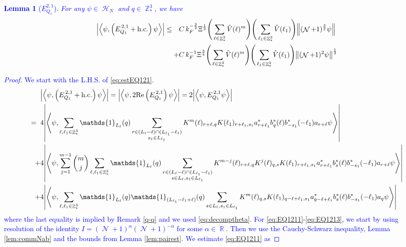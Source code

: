 \documentclass[sn-mathphys, Numbered ,a4paper]{sn-jnl}%
\DeclareMathOperator{\R}{\mathbb{R}}
\DeclareMathOperator{\Z}{\mathbb{Z}}
\DeclareMathOperator{\HH}{\mathcal{H}}
\DeclareMathOperator{\NN}{\mathcal{N}}
\newcommand{\half}{\frac{1}{2}}
\newcommand{\eva}[1]{\left\langle #1 \right\rangle}
\theoremstyle{plain}
\newtheorem{lemma}[theorem]{Lemma}
\theoremstyle{definition}
\theoremstyle{remark}
\theoremstyle{plain}
\theoremstyle{definition}
\theoremstyle{remark}
\begin{document}
\textcolor{blue}{\begin{lemma}[$E_{Q_1}^{2,1}$]
For any $\psi \in \HH_N$ and $q \in \Z^3_*$, we have
\begin{alignat}{2}
	\abs{\eva{\psi,\left(E^{\,2,1}_{Q_1}+\mathrm{h.c.}\right) \psi }}\nonumber
	 \leq \quad &C\,  k_{F}^{-\frac{3}{2}} \Xi^\half \Bigg(\sum\limits_{\ell \in \Z^3_*} \hat{V}(\ell)^m\Bigg)\Bigg( \sum\limits_{\ell_1 \in \Z^3_*} \hat{V}(\ell_1) \Bigg) \norm { (\NN+1)^{\frac{3}{2}} \psi }\\
	\quad+ &C\, k_{F}^{-1}\Xi^{\frac{3}{4}} \Bigg(\sum\limits_{\ell \in \Z^3_*} \hat{V}(\ell)^m\Bigg) \Bigg(\sum\limits_{\ell_1 \in \Z^3_*} \hat{V}(\ell_1) \Bigg)  \norm{ (\NN+1)^2\psi}^\half\label{eq:estEQ121}
\end{alignat}
\end{lemma}
\begin{proof}
We start with the L.H.S. of \eqref{eq:estEQ121}.
\begin{align}
	&\abs{\eva{\psi,\left(E^{\,2,1}_{Q_1}+\mathrm{h.c.}\right) \psi }} = \abs{\eva{\psi,2\mathrm{Re}\left(E^{\,2,1}_{Q_1}\right) \psi }} = 2\abs{\eva{\psi, E^{\,2,1}_{Q_1} \psi }}\nonumber\\
	=\;\;&4  \abs{\eva{\psi, \sum\limits_{\ell, \ell_1\in \Z^3_*} \mathds{1}_{L_{\ell}}(q) \sum\limits_{\substack{r\in (L_{\ell}-\ell) \cap (L_{\ell_1}-\ell_1)\\ s_1\in L_{\ell_1} }} K^m(\ell )_{r+\ell,q}K(\ell_1)_{r+\ell_1,s_1}
	a^*_{r+\ell_1} b^*_{q}(\ell) b^*_{-s_1}(-\ell_1)a_{r+\ell} \psi }} \label{eq:EQ1211}\\
	\;+&4   \abs{\eva{\psi, \sum\limits_{j=1}^{m-1} {{m}\choose j} \sum\limits_{\ell, \ell_1\in \Z^3_*}\mathds{1}_{L_{\ell}}(q) \sum\limits_{\substack{r\in (L_{\ell}-\ell) \cap (L_{\ell_1}-\ell_1)\\ s \in L_{\ell},s_1\in L_{\ell_1} }} K^{m-j}(\ell)_{r+\ell,q} K^{j}(\ell)_{q,s} K(\ell_1)_{r+\ell_1,s_1} a^*_{r+\ell_1} b^*_{s}(\ell) b^*_{-s_1}(-\ell_1) a_{r+\ell} \psi }} \label{eq:EQ1212}\\
	\;+&4\abs{\eva{\psi, \sum\limits_{\ell, \ell_1\in \Z^3_*} \mathds{1}_{L_{\ell}}(q) \mathds{1}_{(L_{\ell_1}-\ell_1+\ell)}(q) \sum\limits_{s \in L_{\ell},s_1\in L_{\ell_1}}  K^m(\ell)_{q,s} K(\ell_1)_{q-\ell+\ell_1,s_1} a^*_{q-\ell+\ell_1} b^*_{s}(\ell) b^*_{-s_1}(-\ell_1) a_{q} \psi }}\label{eq:EQ1213}
\end{align}
where the last equality is implied by Remark \ref{q-q} and we used \eqref{eq:decomptheta}.
For \eqref{eq:EQ1211}-\eqref{eq:EQ1213}, we start by using resolution of the identity $I = (\NN+1)^{\alpha}(\NN+1)^{-\alpha}$ for some $\alpha \in \R$. Then we use the Cauchy-Schwarz inequality, Lemma \ref{lem:commNab} and the bounds from Lemma \ref{lem:pairest}. We estimate \eqref{eq:EQ1211} as

\end{proof}}
\end{document}
